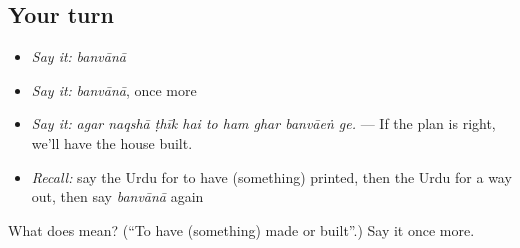 \subsection*{Your turn}
\begin{itemize}
\raggedright
  \item \emph{Say it:} \emph{banvānā}
  \item \emph{Say it:} \emph{banvānā}, once more
  \item \emph{Say it:} \emph{agar naqshā ṭhīk hai to ham ghar banvāeṅ ge.} — If the plan is right, we'll have the house built.
  \item \emph{Recall:} say the Urdu for to have (something) printed, then the Urdu for a way out, then say \emph{banvānā} again
\end{itemize}

\begin{tcolorbox}[breakable,colback=teal!4,colframe=teal!35!black,title={Before you move on}]
What does  mean? (\textquotedblleft{}To have (something) made or built\textquotedblright{}.) Say it once more.
\end{tcolorbox}
